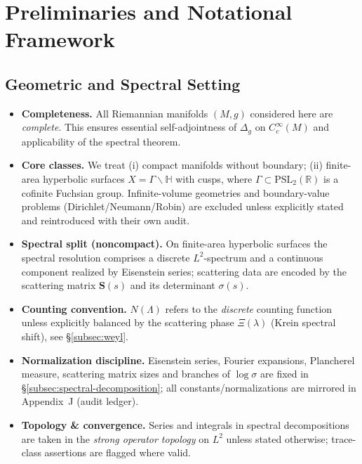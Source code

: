 
\chapter{Preliminaries and Notational Framework}
\label{chap:preliminaries}

\section{Geometric and Spectral Setting}
\label{sec:geom-spectral-setting}

\begin{tcolorbox}[colback=gray!5,colframe=gray!35,
  title=Scope \& Assumptions (ZNB-9+++ • MEA-Core-SS • enforced)]
\begin{itemize}
  \item \textbf{Completeness.} All Riemannian manifolds $(M,g)$ considered here are \emph{complete}. This ensures essential self-adjointness of $\Delta_g$ on $C_c^\infty(M)$ and applicability of the spectral theorem.
  \item \textbf{Core classes.} We treat (i) compact manifolds without boundary; (ii) finite-area hyperbolic surfaces $X=\Gamma\backslash\mathbb{H}$ with cusps, where $\Gamma\subset\mathrm{PSL}_2(\mathbb{R})$ is a cofinite Fuchsian group. Infinite-volume geometries and boundary-value problems (Dirichlet/Neumann/Robin) are excluded unless explicitly stated and reintroduced with their own audit.
  \item \textbf{Spectral split (noncompact).} On finite-area hyperbolic surfaces the spectral resolution comprises a discrete $L^2$-spectrum and a continuous component realized by Eisenstein series; scattering data are encoded by the scattering matrix $\mathbf{S}(s)$ and its determinant $\sigma(s)$.
  \item \textbf{Counting convention.} $N(\Lambda)$ refers to the \emph{discrete} counting function unless explicitly balanced by the scattering phase $\Xi(\lambda)$ (Krein spectral shift), see \S\ref{subsec:weyl}.
  \item \textbf{Normalization discipline.} Eisenstein series, Fourier expansions, Plancherel measure, scattering matrix sizes and branches of $\log\sigma$ are fixed in \S\ref{subsec:spectral-decomposition}; all constants/normalizations are mirrored in Appendix~J (audit ledger).
  \item \textbf{Topology \& convergence.} Series and integrals in spectral decompositions are taken in the \emph{strong operator topology} on $L^2$ unless stated otherwise; trace-class assertions are flagged where valid.
\end{itemize}
\end{tcolorbox}

